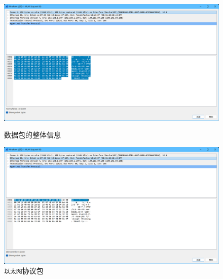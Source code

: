 \documentclass{article}
\begin{document}
\begin{figure}[H]
  \centering
  \begin{minipage}[b]{0.45\textwidth}
    \includegraphics[width=\textwidth]{images/05.png}
    \caption{数据包的整体信息}
  \end{minipage}
  \hfill
  \begin{minipage}[b]{0.45\textwidth}
    \includegraphics[width=\textwidth]{images/06.png}
    \caption{\texttt{以太网}协议包}
  \end{minipage}
\end{figure}
\end{document}

